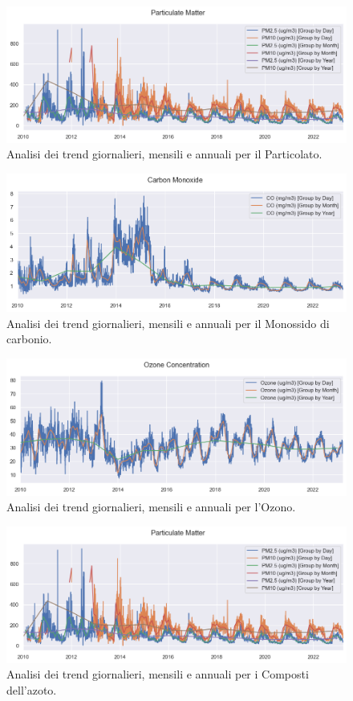 \documentclass[a4paper,12pt]{report}
\begin{document}
	\begin{figure}[H]
		\centering
		\includegraphics[width=1.0\textwidth]{img/pm_trend_pm.png}
		\caption{Analisi dei trend giornalieri, mensili e annuali per il Particolato.}
	\end{figure}
	\begin{figure}[H]
		\centering
		\includegraphics[width=1.0\textwidth]{img/carbon_trend_pm.png}
		\caption{Analisi dei trend giornalieri, mensili e annuali per il Monossido di carbonio.}
	\end{figure}
	\begin{figure}[H]
		\centering
		\includegraphics[width=1.0\textwidth]{img/ozone_trend_pm.png}
		\caption{Analisi dei trend giornalieri, mensili e annuali per l'Ozono.}
	\end{figure}
	\begin{figure}[H]
		\centering
		\includegraphics[width=1.0\textwidth]{img/pm_trend_pm.png}
		\caption{Analisi dei trend giornalieri, mensili e annuali per i Composti dell'azoto.}
	\end{figure}
\end{document}
